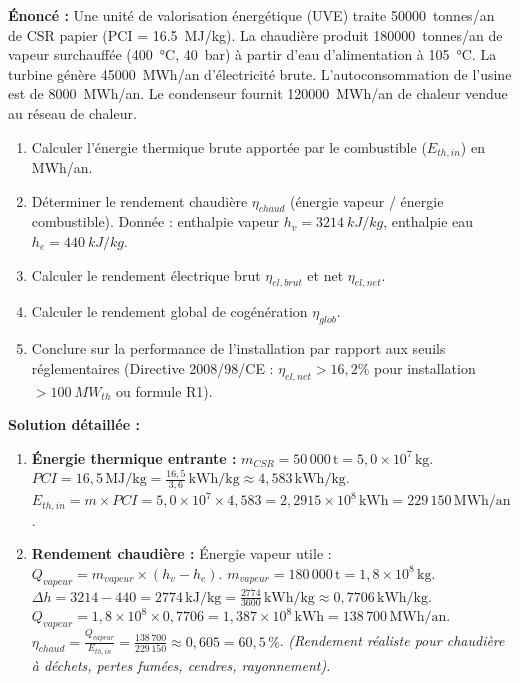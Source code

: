 \documentclass[11pt]{article}
\begin{document}
\begin{exoresolu}
\textbf{Énoncé :} Une unité de valorisation énergétique (UVE) traite \SI{50 000}{tonnes/an} de CSR papier (PCI = \SI{16,5}{MJ/kg}). La chaudière produit \SI{180 000}{tonnes/an} de vapeur surchauffée (\SI{400}{\celsius}, \SI{40}{bar}) à partir d'eau d'alimentation à \SI{105}{\celsius}. La turbine génère \SI{45 000}{MWh/an} d'électricité brute. L'autoconsommation de l'usine est de \SI{8 000}{MWh/an}. Le condenseur fournit \SI{120 000}{MWh/an} de chaleur vendue au réseau de chaleur.
\begin{enumerate}
    \item Calculer l'énergie thermique brute apportée par le combustible ($E_{th,in}$) en MWh/an.
    \item Déterminer le rendement chaudière $\eta_{chaud}$ (énergie vapeur / énergie combustible). Donnée : enthalpie vapeur $h_v = \SI{3214}{kJ/kg}$, enthalpie eau $h_e = \SI{440}{kJ/kg}$.
    \item Calculer le rendement électrique brut $\eta_{el,brut}$ et net $\eta_{el,net}$.
    \item Calculer le rendement global de cogénération $\eta_{glob}$.
    \item Conclure sur la performance de l'installation par rapport aux seuils réglementaires (Directive 2008/98/CE : $\eta_{el,net} > 16,2\%$ pour installation $> \SI{100}{MW_{th}}$ ou formule R1).
\end{enumerate}
\tcblower
\textbf{Solution détaillée :}
\begin{enumerate}
    \item \textbf{Énergie thermique entrante :}
    $m_{CSR} = 50\,000\,\text{t} = 5,0 \times 10^7\,\text{kg}$.
    $PCI = 16,5\,\text{MJ/kg} = \frac{16,5}{3,6}\,\text{kWh/kg} \approx 4,583\,\text{kWh/kg}$.
    $E_{th,in} = m \times PCI = 5,0 \times 10^7 \times 4,583 = 2,2915 \times 10^8\,\text{kWh} = \boxed{229\,150\,\text{MWh/an}}$.
    
    \item \textbf{Rendement chaudière :}
    Énergie vapeur utile : $Q_{vapeur} = m_{vapeur} \times (h_v - h_e)$.
    $m_{vapeur} = 180\,000\,\text{t} = 1,8 \times 10^8\,\text{kg}$.
    $\Delta h = 3214 - 440 = 2774\,\text{kJ/kg} = \frac{2774}{3600}\,\text{kWh/kg} \approx 0,7706\,\text{kWh/kg}$.
    $Q_{vapeur} = 1,8 \times 10^8 \times 0,7706 = 1,387 \times 10^8\,\text{kWh} = 138\,700\,\text{MWh/an}$.
    $\eta_{chaud} = \frac{Q_{vapeur}}{E_{th,in}} = \frac{138\,700}{229\,150} \approx 0,605 = \boxed{60,5\,\%}$.
    \textit{(Rendement réaliste pour chaudière à déchets, pertes fumées, cendres, rayonnement).}
    

\end{enumerate}
\end{exoresolu}
\end{document}
